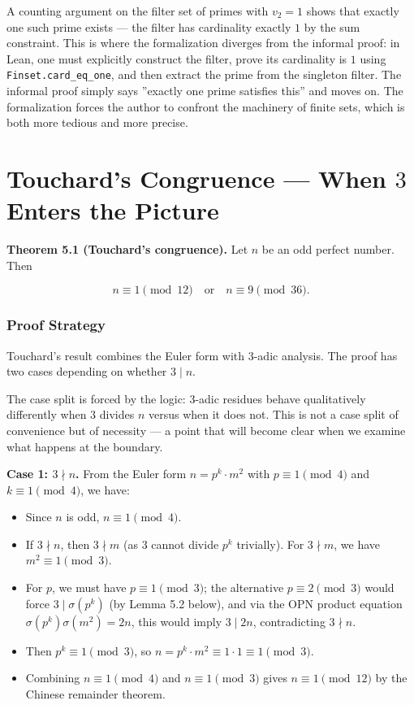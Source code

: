 \documentclass[11pt,a4paper]{article}
\begin{document}
A counting argument on the filter set of primes with $v_2 = 1$ shows that exactly one such prime exists --- the filter has cardinality exactly $1$ by the sum constraint. This is where the formalization diverges from the informal proof: in Lean, one must explicitly construct the filter, prove its cardinality is $1$ using \texttt{Finset.card\_eq\_one}, and then extract the prime from the singleton filter. The informal proof simply says ''exactly one prime satisfies this'' and moves on. The formalization forces the author to confront the machinery of finite sets, which is both more tedious and more precise.

\section{Touchard's Congruence --- When $3$ Enters the Picture}

\textbf{Theorem 5.1 (Touchard's congruence).} Let $n$ be an odd perfect number. Then

\[n \equiv 1 \pmod{12} \quad \text{or} \quad n \equiv 9 \pmod{36}.\]

\subsubsection{Proof Strategy}

Touchard's result combines the Euler form with $3$-adic analysis. The proof has two cases depending on whether $3 \mid n$.

The case split is forced by the logic: $3$-adic residues behave qualitatively differently when $3$ divides $n$ versus when it does not. This is not a case split of convenience but of necessity --- a point that will become clear when we examine what happens at the boundary.

\textbf{Case 1: $3 \nmid n$.} From the Euler form $n = p^k \cdot m^2$ with $p \equiv 1 \pmod{4}$ and $k \equiv 1 \pmod{4}$, we have:

\begin{itemize}
    \item Since $n$ is odd, $n \equiv 1 \pmod{4}$.
    \item If $3 \nmid n$, then $3 \nmid m$ (as $3$ cannot divide $p^k$ trivially). For $3 \nmid m$, we have $m^2 \equiv 1 \pmod{3}$.
    \item For $p$, we must have $p \equiv 1 \pmod{3}$; the alternative $p \equiv 2 \pmod{3}$ would force $3 \mid \sigma(p^k)$ (by Lemma 5.2 below), and via the OPN product equation $\sigma(p^k)\sigma(m^2) = 2n$, this would imply $3 \mid 2n$, contradicting $3 \nmid n$.
    \item Then $p^k \equiv 1 \pmod{3}$, so $n = p^k \cdot m^2 \equiv 1 \cdot 1 \equiv 1 \pmod{3}$.
    \item Combining $n \equiv 1 \pmod{4}$ and $n \equiv 1 \pmod{3}$ gives $n \equiv 1 \pmod{12}$ by the Chinese remainder theorem.
\end{itemize}
\end{document}
